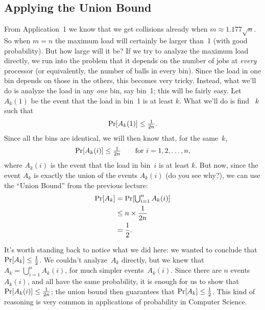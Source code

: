 \documentclass[11pt]{article}
\def\half{{\textstyle{1\over 2}}}
\begin{document}
\subsection*{Applying the Union Bound}
From Application~1 we know that we get collisions already when
$m\approx 1.177\sqrt{n}$.  So when $m=n$ the maximum load will
certainly be larger than~1 (with good probability).  But how
large will it be?  If we try to analyze the maximum load directly,
we run into the problem that it depends on the number
of jobs at {\it every\/} processor (or equivalently, the number of
balls in every bin).  Since the load in one bin depends on those in
the others, this becomes very tricky.  Instead, what we'll do is
analyze the load in any {\it one\/} bin, say bin~1; this will be
fairly easy. Let $A_k(1)$ be the event that the load in bin~1
is at least $k$. What we'll do is find ~$k$ such that 
\begin{equation}\label{eq20}
   \Pr[A_k(1)] \le {\textstyle{1\over{2n}}}.
\end{equation}
Since all the bins are identical, we will then know that, for the
same~$k$, $$
   \Pr[A_k(i)] \le {\textstyle{1\over{2n}}}\qquad\hbox{\rm for $i=1,2,\ldots,n$},  $$
where $A_k(i)$ is the event that the load in bin~$i$ is at least $k$.  But now, since the
event $A_k$ is exactly the union of the events $A_k(i)$ (do you see why?),
we can use the ``Union Bound'' from the previous lecture:
\begin{align*}
\Pr[A_k]
  &= \Pr[{\textstyle\bigcup_{i=1}^n A_k(i)}]\\
  &\le n\times{1\over{2n}}\\
  &= {1\over 2}.
\end{align*}

It's worth standing back to notice what we did here: we wanted to conclude
that $\Pr[A_k]\le\half$.  We couldn't
analyze~$A_k$ directly, but we knew that $A_k=\bigcup_{i=1}^n A_k(i)$, for
much simpler events~$A_k(i)$.  Since there are $n$ events~$A_k(i)$, and all have the
same probability, it is enough for us to show that $\Pr[A_k(i)]\le {1\over{2n}}$;
the union bound then guarantees that $\Pr[A_k]\le\half$.  This kind of
reasoning is very common in applications of probability in Computer
Science.
\end{document}
